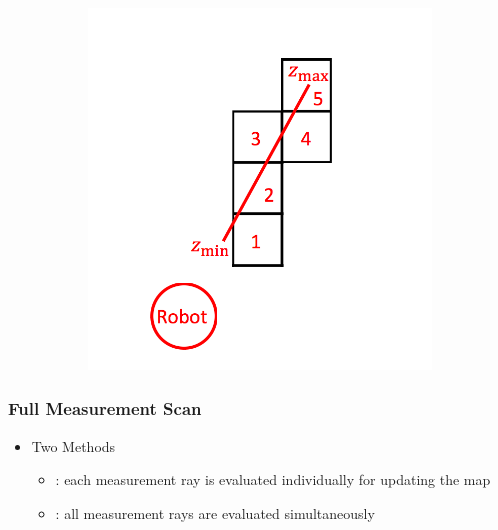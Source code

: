 \documentclass[11pt,professionalfonts,hyperref={pdftex,pdfpagemode=none,pdfstartview=FitH}]{beamer}
\renewcommand{\emph}[1]{\textit{\textbf{\color{blue}{#1}}}}
\begin{document}
\begin{frame}
\begin{figure}[!ht]
\begin{subfigure}[t]{0.4\columnwidth}
        \includegraphics[width=\textwidth]{RayCastIllustrationReducedMapOnly.png}
    \end{subfigure}
\end{figure}

\end{frame}

\begin{frame}
\frametitle{Full Measurement Scan}

\begin{itemize}
	\item Two Methods
	\begin{itemize}
		\item \emph{Ray-By-Ray Inverse Sensor Model}: each measurement ray is evaluated individually for updating the map
		\item \emph{Synergistic Scan Inverse Sensor Model}: all measurement rays are evaluated simultaneously
	\end{itemize}
\end{itemize}

\end{frame}
\end{document}
